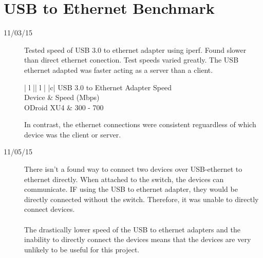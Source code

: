 \section{USB to Ethernet Benchmark}
\begin{description}
\item [11/03/15] Tested speed of USB 3.0 to ethernet adapter using iperf. Found slower than direct ethernet conection. Test speeds varied greatly. The USB ethernet adapted was faster acting as a server than a client.

\begin{center}
\begin{tabular}{ | l || l | }
\hline
{}
{ |c| }{ USB 3.0 to Ethernet Adapter Speed } \\
\hline
Device & Speed (Mbps) \\
\hline
ODroid XU4 & 300 - 700 \\
\hline
\end{tabular}
\end{center}

In contrast, the ethernet connections were consistent reguardless of which device was the client or server.

\item [11/05/15] There isn't a found way to connect two devices over USB-ethernet to ethernet directly. When attached to the switch, the devices can communicate. IF using the USB to ethernet adapter, they would be directly connected without the switch. Therefore, it was unable to directly connect devices. \\ \\
The drastically lower speed of the USB to ethernet adapters and the inability to directly connect the devices means that the devices are very unlikely to be useful for this project.
\end{description}